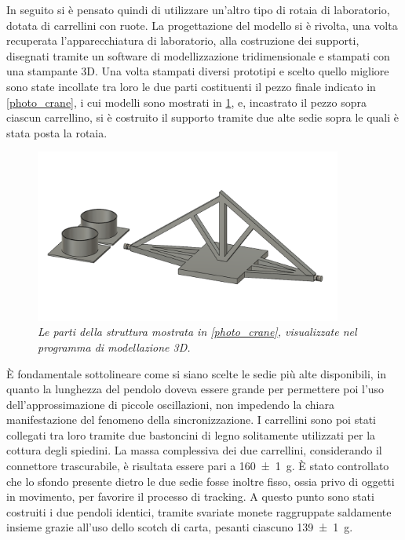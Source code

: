 \documentclass[11pt, a4paper, twoside, italian]{article}
\begin{document}
In seguito si è pensato quindi di utilizzare un'altro tipo di rotaia di laboratorio, dotata
di carrellini con ruote.
La progettazione del modello si è rivolta, una volta recuperata l'apparecchiatura
di laboratorio, alla costruzione dei supporti, disegnati tramite un
software di modellizzazione tridimensionale e stampati con una stampante 3D.
Una volta stampati diversi prototipi e scelto quello migliore sono state incollate
tra loro le due parti costituenti il pezzo finale indicato in \cref{photo_crane}, i cui modelli sono mostrati
in \cref{photo_piece}, e, 
incastrato il pezzo sopra ciascun carrellino, si è costruito il supporto tramite due alte sedie
sopra le quali è stata posta la rotaia. 
\begin{figure}[h!]
  \centering
  \includegraphics[width=0.9\textwidth]{../../media/img/fusion_project_cut.png}
  \caption{\textit{Le parti della struttura mostrata in \cref{photo_crane}, visualizzate nel programma
  di modellazione 3D.}}
  \label{photo_piece}
\end{figure}
È fondamentale sottolineare come si siano scelte le sedie più alte disponibili,
in quanto la lunghezza del pendolo doveva essere grande
per permettere poi l'uso dell'approssimazione di piccole oscillazioni,
non impedendo la chiara manifestazione del fenomeno della sincronizzazione.
I carrellini sono poi stati collegati tra loro tramite due bastoncini 
di legno solitamente utilizzati per la cottura degli spiedini.
La massa complessiva dei due carrellini, considerando il connettore trascurabile, è risultata essere pari a 
\SI{160 \pm 1}{\g}.
È stato controllato che lo sfondo presente dietro le
due sedie fosse inoltre fisso, ossia privo di oggetti
in movimento, per favorire il processo di tracking.
A questo punto sono stati costruiti i due pendoli identici, tramite svariate 
monete raggruppate saldamente insieme grazie all'uso dello scotch di carta, 
pesanti ciascuno \SI{139 \pm 1}{\g}.
\end{document}
